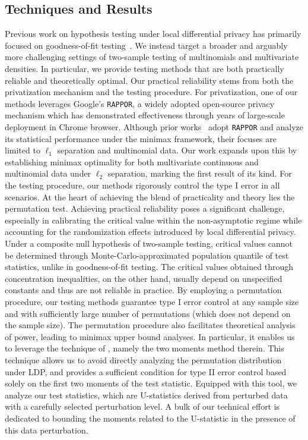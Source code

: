 \documentclass[twoside,11pt]{article}
\begin{document}
\subsection{Techniques and Results}\label{subsection:techniques}
Previous work on hypothesis testing under local differential privacy has primarily focused on goodness-of-fit testing~\citep{Dubois2022, Lam-Weil2021MinimaxConstraint}. We instead target a broader and arguably more challenging settings of two-sample testing of multinomials and multivariate densities.  In particular, we provide testing methods that are both practically reliable and theoretically optimal.
Our practical reliability stems from both the privatization mechanism and the testing procedure. For privatization, one of our methods leverages Google's \texttt{RAPPOR}, a widely adopted open-source privacy mechanism  which has demonstrated effectiveness through years of large-scale deployment in Chrome browser. 
Although prior works~\citep{duchi2013local, acharya_test_2019, acharya_estimating_2021} adopt \texttt{RAPPOR} and analyze its statistical performance under the minimax framework, their focuses are limited to $\ell_1$ separation and multinomial data. Our work expands upon this by establishing minimax optimality for both multivariate continuous and multinomial data under  $\ell_2$ separation, marking the first result of its kind.
For the testing procedure, our methods rigorously control the type I error in all scenarios. At the heart of achieving the blend of practicality and theory lies the permutation test.
Achieving practical reliability poses a significant challenge, especially in calibrating the critical value within the non-asymptotic regime while accounting for the randomization effects introduced by local differential privacy.
Under a composite null hypothesis of two-sample testing, critical values cannot be determined through Monte-Carlo-approximated population quantile of test statistics,
unlike in goodness-of-fit testing.
The critical values obtained through concentration inequalities, on the other hand, usually depend on unspecified constants and thus are not reliable in practice.
By employing a permutation procedure, our testing methods guarantee type I error control at any sample size and with sufficiently large number of permutations (which does not depend on the sample size). The permutation procedure also facilitates theoretical analysis of power, leading to minimax upper bound analyses. In particular, it enables us to leverage the technique of \citet{kim_minimax_2022}, namely the two moments method therein.
This technique allows us to avoid directly analyzing the permutation distribution under LDP, and provides a sufficient condition for type II error control based solely on the first two moments of the test statistic. Equipped with this tool, we analyze our test statistics, which are U-statistics derived from perturbed data with a carefully selected perturbation level. A bulk of our technical effort is dedicated to bounding the moments related to the U-statistic in the presence of this data perturbation.
\end{document}
